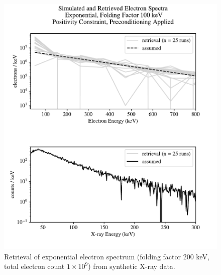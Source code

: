 \begin{figure}[p]
    \centering
    \includegraphics[width=\textwidth]{figures/chapter_4/synthetic_data_examples/exponential_folding_200keV_posonly_preconditioning_1e9_particles}
    \caption{Retrieval of exponential electron spectrum (folding factor 200 keV, total electron count $1\times10^9$) from synthetic X-ray data.}
    \label{why_non_negative_is_good}
\end{figure}

